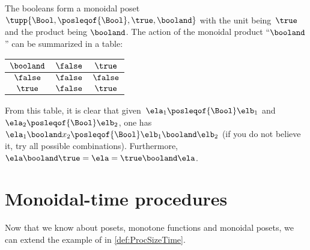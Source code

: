 \begin{example}
    The booleans form a monoidal poset $\tupp{\Bool,\posleqof{\Bool},\true,\booland}$
    with the unit being~$\true$ and the product being $\booland$.
    The action of the monoidal product ``$\booland$'' can be summarized in a table:
    \begin{center}
        \begin{tabular}{c|cc}
            $\booland$ & $\false$ & $\true$ \\
            \hline
            $\false$   & $\false$ & $\false$ \\
            $\true$    & $\false$ & $\true$
        \end{tabular}
    \end{center}
    From this table, it is clear that given~$\ela_1\posleqof{\Bool}\elb_1$ and~$\ela_2\posleqof{\Bool} \elb_2$, one has~$\ela_1\booland x_2\posleqof{\Bool} \elb_1\booland \elb_2$ (if you do not believe it, try all possible combinations).
    Furthermore,~$\ela\booland \true=\ela=\true \booland \ela$.
\end{example}


\section{Monoidal-time procedures}
\label{sec:ProcMod}

Now that we know about posets, monotone functions and monoidal posets, we can extend the example of \ProcSizeTime in \vref{def:ProcSizeTime}.

